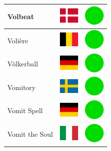 \documentclass[12pt, a4paper, twoside]{report}
\begin{document}
\begin{center}
\begin{longtable}{|p{5cm}|p{2cm}|p{2cm}|}
 Volbeat                                                    & \includegraphics[width=1cm]{../4x3/dk} &   \includegraphics[width=1cm]{../likes/y} \\ \hline
 Volière                                                    & \includegraphics[width=1cm]{../4x3/be} &   \includegraphics[width=1cm]{../likes/y} \\ \hline
 Völkerball                                                 & \includegraphics[width=1cm]{../4x3/de} &   \includegraphics[width=1cm]{../likes/y} \\ \hline
 Vomitory                                                   & \includegraphics[width=1cm]{../4x3/se} &   \includegraphics[width=1cm]{../likes/y} \\ \hline
 Vomit Spell                                                & \includegraphics[width=1cm]{../4x3/de} &   \includegraphics[width=1cm]{../likes/y} \\ \hline
 Vomit the Soul                                             & \includegraphics[width=1cm]{../4x3/it} &   \includegraphics[width=1cm]{../likes/y} \\ \hline

\end{longtable}
\end{center}
\end{document}
